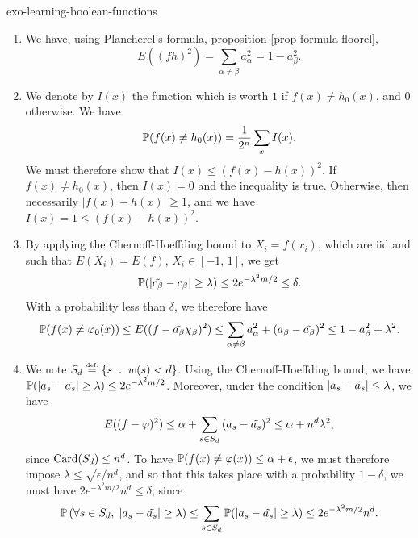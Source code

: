  
\begin{correction}{exo-learning-boolean-functions}
\begin{enumerate}
\item We have, using Plancherel's formula, proposition \ref{prop-formula-floorel},
\begin{equation*}
E ((fh)^2) = \sum_{\alpha \neq \beta}{a_\alpha^2} = 1-a_\beta^2.
\end{equation*}
 
\item We denote by $ I (x) $ the function which is worth $ 1 $ if $ f(x) \neq h_0 (x) $, and $ 0 $ otherwise. We have
\begin{equation*}
\mathbb{P} (f(x) \neq h_0 (x)) = \frac{1}{2^n} \sum_{x}{I (x)}.
\end{equation*}
We must therefore show that $ I (x) \leq (f(x) -h (x))^2 $. If $ f(x) \neq h_0 (x) $, then $ I (x) = 0 $ and the inequality is true. Otherwise, then necessarily $ | f(x) -h (x) | \geq 1 $, and we have $ I (x) = 1 \leq (f(x) -h (x))^2 $.
\item By applying the Chernoff-Hoeffding bound to $ X_i = f(x_i) $, which are iid and such that $ E (X_i) = E (f) $, $ X_i \in [-1, \, 1] $, we get
\begin{equation*}
\mathbb{P} (| \tilde{c_\beta} - c_\beta | \geq \lambda) \leq 2e^{- \lambda^2 m/2} \leq \delta.
\end{equation*}
With a probability less than $ \delta $, we therefore have
\begin{equation*}
\mathbb{P} (f(x) \neq \varphi_0 (x)) \leq E ((f- \tilde{a_\beta} \chi_\beta)^2) \leq \sum_{\alpha \neq \beta}{a_\alpha^2} + (a_\beta- \tilde{a_\beta})^2 \leq 1-a_\beta^2 + \lambda^2.
\end{equation*}
 
\item We note $ S_d \stackrel{\mbox{\upshape\tiny def.}}{=} \left\{ s \;:\; w (s) <d \right\} $. Using the Chernoff-Hoeffding bound, we have $ \mathbb{P} (| a_s- \tilde{a_s} | \geq \lambda) \leq 2e^{- \lambda^2 m/2} $. Moreover, under the condition $ | a_s- \tilde{a_s} | \leq \lambda $, we have
\begin{equation*}
E ((f- \varphi)^2) \leq \alpha + \sum_{s \in S_d}{(a_s - \tilde{a_s})^2} \leq \alpha + n^d \lambda^2,
\end{equation*}
since $ \operatorname{Card} (S_d) \leq n^d $. To have $ \mathbb{P} (f(x) \neq \varphi (x)) \leq \alpha + \epsilon $, we must therefore impose $ \lambda \leq \sqrt{\epsilon/n^d} $, and so that this takes place with a probability $ 1- \delta $, we must have $ 2 e^{- \lambda^2 m/2} n^d \leq \delta $, since
\begin{equation*}
\mathbb{P} \left(\forall s \in S_d, \; | a_s - \tilde{a_s} | \geq \lambda \right) \leq \sum_{s \in S_d}{\mathbb{P} (| a_s - \tilde{a_s} | \geq \lambda)} \leq 2 e^{- \lambda^2 m/2} n^d.
\end{equation*}
\end{enumerate}
\end{correction}
 
